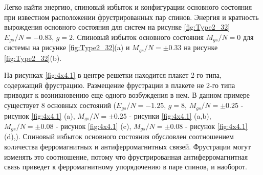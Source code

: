 \documentclass[utf8, babel, sor, jor, amsmath, amssymb, reprint]{elsarticle} %
\begin{document}
Легко найти энергию, спиновый избыток и конфигурации основного состояния при известном расположении фрустрированных пар спинов. Энергия и кратность вырождения основного состояния для систем на рисунке \ref{fig:Type2_32} $E_{gs}/N=-0.83$, $g=2$. Спиновый избыток основного состояния $M_{gs}/N=0$ для системы на рисунке \ref{fig:Type2_32}(a) и $M_{gs}/N=\pm 0.33$ на рисунке \ref{fig:Type2_32}(b).


На рисунках \ref{fig:4x4.1} в центре решетки находится плакет 2-го типа, содержащий фрустрацию. Размещение фрустрации в плакете не 2-го типа приводит к возникновению еще одного возбуждения в нем. В данном примере существует 8 основных состояний ($E_{gs}/N=-1.25$, $g=8$, $M_{gs}/N=\pm 0.25$ - рисунок \ref{fig:4x4.1} (a), $M_{gs}/N=\pm 0.25$ - рисунки \ref{fig:4x4.1} (a,b), $M_{gs}/N=\pm 0.08$ - рисунок \ref{fig:4x4.1} (c), $M_{gs}/N=\pm 0.08$ - рисунок \ref{fig:4x4.1} (d),). Спиновый избыток основного состояния обусловлен соотношением количества ферромагнитных и антиферромагнитных связей. Фрустрации могут изменять это соотношение, потому что фрустрированная антиферромагнитная связь приведет к ферромагнитному упорядочению в паре спинов, и наоборот.
\end{document}
